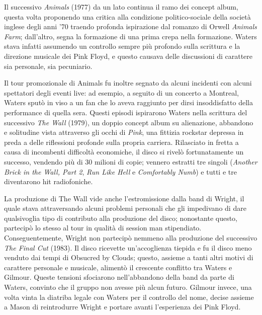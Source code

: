 \documentclass[class=book, crop=false, oneside, 12pt]{standalone}
\begin{document}
    Il successivo \emph{Animals} (1977) da un lato continua il ramo dei concept album, questa volta proponendo una critica alla condizione politico-sociale della società inglese degli anni '70 traendo profonda ispirazione dal romanzo di Orwell \emph{Animals Farm}; dall'altro, segna la formazione di una prima crepa nella formazione. Waters stava infatti assumendo un controllo sempre più profondo sulla scrittura e la direzione musicale dei Pink Floyd, e questo causava delle discussioni di carattere sia personale, sia pecuniario. 
    
    Il tour promozionale di Animals fu inoltre segnato da alcuni incidenti con alcuni spettatori degli eventi live: ad esempio, a seguito di un concerto a Montreal, Waters sputò in viso a un fan che lo aveva raggiunto per dirsi insoddisfatto della performance di quella sera. Questi episodi ispirarono Waters nella scrittura del successivo \emph{The Wall} (1979), un doppio concept album su alienazione, abbandono e solitudine vista attraverso gli occhi di \emph{Pink}, una fittizia rockstar depressa in preda a delle riflessioni profonde sulla propria carriera. Rilasciato in fretta a causa di incombenti difficoltà economiche, il disco si rivelò fortunatamente un successo, vendendo più di 30 milioni di copie; vennero estratti tre singoli (\emph{Another Brick in the Wall, Part 2}, \emph{Run Like Hell} e \emph{Comfortably Numb}) e tutti e tre diventarono hit radiofoniche. 
    
    La produzione di The Wall vide anche l'estromissione dalla band di Wright, il quale stava attraversando alcuni problemi personali che gli impedivano di dare qualsivoglia tipo di contributo alla produzione del disco; nonostante questo, partecipò lo stesso al tour in qualità di session man stipendiato. Conseguentemente, Wright non partecipò nemmeno alla produzione del successivo \emph{The Final Cut} (1983). Il disco ricevette un'accoglienza tiepida e fu il disco meno venduto dai tempi di Obsucred by Clouds; questo, assieme a tanti altri motivi di carattere personale e musicale, alimentò il crescente conflitto tra Waters e Gilmour. Queste tensioni sfociarono nell'abbandono della band da parte di Waters, convinto che il gruppo non avesse più alcun futuro. Gilmour invece, una volta vinta la diatriba legale con Waters per il controllo del nome, decise assieme a Mason di reintrodurre Wright e portare avanti l'esperienza dei Pink Floyd.
\end{document}
